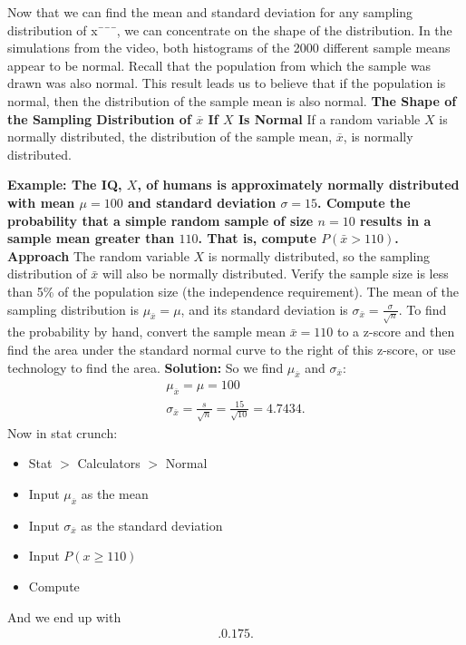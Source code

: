 \documentclass{report}
\begin{document}
     \pagebreak \bigbreak \noindent 
     Now that we can find the mean and standard deviation for any sampling distribution of x¯¯¯, we can concentrate on the shape of the distribution. In the simulations from the video, both histograms of the 2000 different sample means appear to be normal. Recall that the population from which the sample was drawn was also normal. This result leads us to believe that if the population is normal, then the distribution of the sample mean is also normal.
     \bigbreak \noindent 
     \textbf{The Shape of the Sampling Distribution of $\overline{x} $ If $X$ Is Normal}
     \bigbreak \noindent 
     If a random variable $X $ is normally distributed, the distribution of the sample mean, $\overline{x} $, is normally distributed.
     \bigbreak \noindent 
     \begin{mdframed}
       \textbf{Example: The IQ, $X$, of humans is approximately normally distributed with mean $\mu=100$ and standard deviation $\sigma=15$. Compute the probability that a simple random sample of size $n=10$ results in a sample mean greater than $110$. That is, compute $P(\bar{x}>110)$.}
       \bigbreak \noindent 
       \textbf{Approach}
       \bigbreak \noindent 
        The random variable $X$ is normally distributed, so the sampling distribution of $\bar{x}$ will also be normally distributed. Verify the sample size is less than 5\% of the population size (the independence requirement). The mean of the sampling distribution is $\mu_{\bar{x}}=\mu$, and its standard deviation is $\sigma_{\bar{x}}=\frac{\sigma}{\sqrt{n}}$. To find the probability by hand, convert the sample mean $\bar{x}=110$ to a z-score and then find the area under the standard normal curve to the right of this z-score, or use technology to find the area.
        \bigbreak \noindent 
        \textbf{Solution:}
        \bigbreak \noindent 
        So we find $\mu_{\overline{x}}$ and $\sigma_{\overline{x}}:$
        \begin{align*}
            \mu_{\overline{x}} = \mu = 100 \\
            \sigma_{\overline{x}} = \frac{s}{\sqrt{n}} = \frac{15}{\sqrt{10}} = 4.7434
        .\end{align*}
        \bigbreak \noindent 
        Now in stat crunch:
        \begin{itemize}
            \item Stat $> $ Calculators $> $ Normal
            \item Input $\mu_{\overline{x}}$ as the mean
            \item Input $\sigma_{\overline{x}}$ as the standard deviation
            \item Input $P(x \geq 110) $
            \item Compute
        \end{itemize}
        \bigbreak \noindent 
        And we end up with
        \begin{align*}
            .0.175
        .\end{align*}
     \end{mdframed}
\end{document}
